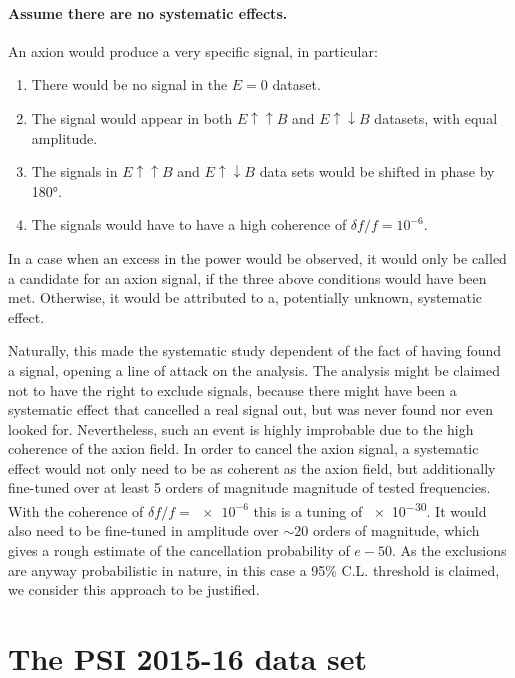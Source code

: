 \paragraph{Assume there are no systematic effects.}
An axion would produce a very specific signal, in particular:
\begin{enumerate}
  \item There would be no signal in the $E=0$ dataset.
  \item The signal would appear in both $E \uparrow \uparrow B$ and $E \uparrow \downarrow B$ datasets, with equal amplitude.
  \item The signals in $E \uparrow \uparrow B$ and $E \uparrow \downarrow B$ data sets would be shifted in phase by \ang{180}.
  \item The signals would have to have a high coherence of $\delta f / f = 10^{-6}$.
\end{enumerate}
In a case when an excess in the power would be observed, it would only be called a candidate for an axion signal, if the three above conditions would have been met. Otherwise, it would be attributed to a, potentially unknown, systematic effect.

Naturally, this made the systematic study dependent of the fact of having found a signal, opening a line of attack on the analysis. The analysis might be claimed not to have the right to exclude signals, because there might have been a systematic effect that cancelled a real signal out, but was never found nor even looked for. Nevertheless, such an event is highly improbable due to the high coherence of the axion field. In order to cancel the axion signal, a systematic effect would not only need to be as coherent as the axion field, but additionally fine-tuned over at least 5 orders of magnitude magnitude of tested frequencies. With the coherence of $\delta f / f = \num{e-6}$ this is a tuning of \num{e-30}. It would also need to be fine-tuned in amplitude over $\sim 20$ orders of magnitude, which gives a rough estimate of the cancellation probability of $e-50$. As the exclusions are anyway probabilistic in nature, in this case a 95\% C.L. threshold is claimed, we consider this approach to be justified.




\section{The PSI 2015-16 data set}

